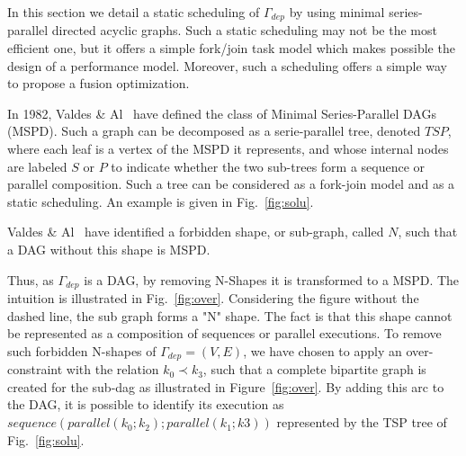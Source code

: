 In this section we detail a static scheduling of $\Gamma_{dep}$ by using minimal series-parallel directed acyclic graphs. Such a static scheduling may not be the most efficient one, but it offers a simple fork/join task model which makes possible the design of a performance model. Moreover, such a scheduling offers a simple way to propose a fusion optimization. 

In 1982, Valdes \& Al~\cite{Valdes:1979:RSP:800135.804393} have defined the class of Minimal Series-Parallel DAGs (MSPD). Such a graph can be decomposed as a serie-parallel tree, denoted $TSP$, where each leaf is a vertex of the MSPD it represents, and whose internal nodes are labeled $S$ or $P$ to indicate whether the two sub-trees form a sequence or parallel composition. Such a tree can be considered as a fork-join model and as a static scheduling. An example is given in Fig.~\ref{fig:solu}.

Valdes \& Al~\cite{Valdes:1979:RSP:800135.804393} have identified a forbidden shape, or sub-graph, called $N$, such that a DAG without this shape is MSPD.

Thus, as $\Gamma_{dep}$ is a DAG, by removing N-Shapes it is transformed to a MSPD. The intuition is illustrated in Fig.~\ref{fig:over}. Considering the figure without the dashed line, the sub graph forms a "N" shape. The fact is that this shape cannot be represented as a composition of sequences or parallel executions.
To remove such forbidden N-shapes of $\Gamma_{dep}=(V,E)$, we have chosen to apply an over-constraint with the relation $k_0 \prec k_3$, such that a complete bipartite graph is created for the sub-dag as illustrated in Figure~\ref{fig:over}. By adding this arc to the DAG, it is possible to identify its execution as $sequence(parallel(k_0;k_2);parallel(k_1;k3))$ represented by the TSP tree of Fig.~\ref{fig:solu}.

